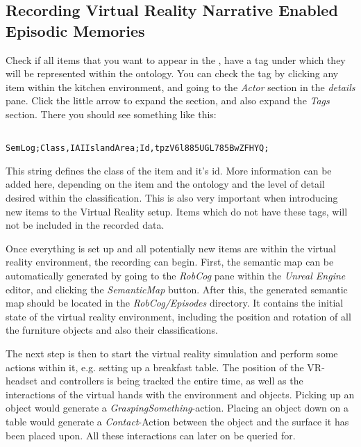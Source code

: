 \subsection{Recording Virtual Reality Narrative Enabled Episodic Memories}
Check if all items that you want to appear in the \neems, have a tag under which they will be represented within the ontology. You can check the tag by clicking any item within the kitchen environment, and going to the \textit{Actor} section in the \textit{details} pane. Click the little arrow to expand the section, and also expand the \textit{Tags} section. There you should see something like this:

\begin{lstlisting}

SemLog;Class,IAIIslandArea;Id,tpzV6l885UGL785BwZFHYQ;

\end{lstlisting}
This string defines the class of the item and it's id. More information can be added here, depending on the item and the ontology and the level of detail desired within the classification. This is also very important when introducing new items to the Virtual Reality setup. Items which do not have these tags, will not be included in the recorded \neem data. 

Once everything is set up and all potentially new items are within the virtual reality environment, the recording can begin. First, the semantic map can be automatically generated by going to the \textit{RobCog} pane within the \textit{Unreal Engine} editor, and clicking the \textit{SemanticMap} button. 
After this, the generated semantic map should be located in the \textit{RobCog/Episodes} directory. It contains the initial state of the virtual reality environment, including the position and rotation of all the furniture objects and also their classifications. 

The next step is then to start the virtual reality simulation and perform some actions within it, e.g. setting up a breakfast table. The position of the VR-headset and controllers is being tracked the entire time, as well as the interactions of the virtual hands with the environment and objects. Picking up an object would generate a \textit{GraspingSomething}-action. Placing an object down on a table would generate a \textit{Contact}-Action between the object and the surface it has been placed upon. All these interactions can later on be queried for. 

